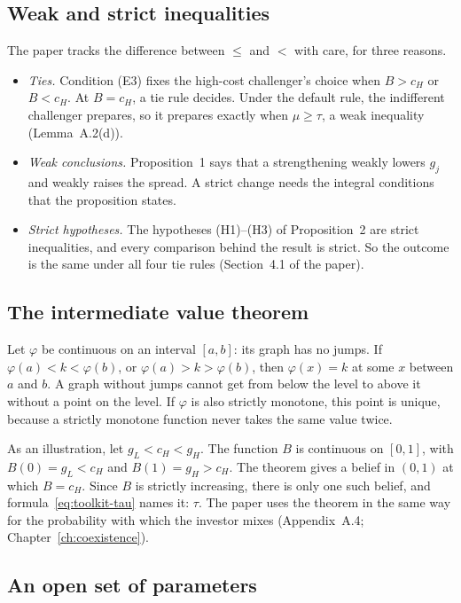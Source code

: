 \subsection{Weak and strict inequalities}

The paper tracks the difference between \(\le\) and \(<\) with care, for three reasons.
\begin{itemize}
\item \emph{Ties.} Condition (E3) fixes the high-cost challenger's choice when \(B>c_H\) or \(B<c_H\). At
\(B=c_H\), a tie rule decides. Under the default rule, the indifferent challenger prepares, so it prepares exactly
when \(\mu\ge\tau\), a weak inequality (Lemma~A.2(d)).
\item \emph{Weak conclusions.} Proposition~1 says that a strengthening weakly lowers \(g_j\) and weakly raises the
spread. A strict change needs the integral conditions that the proposition states.
\item \emph{Strict hypotheses.} The hypotheses (H1)--(H3) of Proposition~2 are strict inequalities, and every
comparison behind the result is strict. So the outcome is the same under all four tie rules (Section~4.1 of the
paper).
\end{itemize}

\subsection{The intermediate value theorem}

Let \(\varphi\) be continuous on an interval \([a,b]\): its graph has no jumps. If \(\varphi(a)<k<\varphi(b)\), or
\(\varphi(a)>k>\varphi(b)\), then \(\varphi(x)=k\) at some \(x\) between \(a\) and \(b\). A graph without jumps
cannot get from below the level to above it without a point on the level. If \(\varphi\) is also strictly
monotone, this point is unique, because a strictly monotone function never takes the same value twice.

As an illustration, let \(g_L<c_H<g_H\). The function \(B\) is continuous on \([0,1]\), with \(B(0)=g_L<c_H\) and
\(B(1)=g_H>c_H\). The theorem gives a belief in \((0,1)\) at which \(B=c_H\). Since \(B\) is strictly increasing,
there is only one such belief, and formula~\eqref{eq:toolkit-tau} names it: \(\tau\). The paper uses the theorem
in the same way for the probability with which the investor mixes (Appendix~A.4; Chapter~\ref{ch:coexistence}).

\subsection{An open set of parameters}

